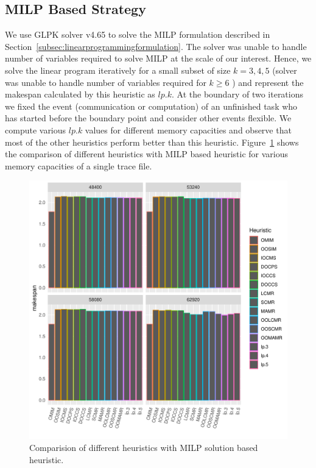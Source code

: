 \documentclass[sigconf]{acmart}
\begin{document}
	
	\subsection{MILP Based Strategy}
	We use GLPK solver v4.65 to solve the MILP formulation described in Section~\ref{subsec:linearprogrammingformulation}. The solver was unable to handle number of variables required to solve MILP at the scale of our interest. Hence, we solve the linear program iteratively for a small subset of size $k=3,4,5$ (solver was unable to handle number of variables required for $k\ge6$ ) and represent the makespan calculated by this heuristic as $lp.k$. At the boundary of two iterations we fixed the event (communication or computation) of an unfinished task who has  started before the boundary point and consider other events flexible. We compute various  $lp.k$ values for different memory capacities and observe that most of the other heuristics perform better than this heuristic. Figure~\ref{fig:iterativeLpSolution} shows the comparison of different heuristics with MILP based heuristic for various memory capacities of a single trace file.
	\begin{figure}[htb]
		\includegraphics[scale=0.5]{./results/makespan_with_lp.pdf}
		\caption{Comparision of different heuristics with MILP solution based heuristic.}
		\label{fig:iterativeLpSolution}
	\end{figure}
	
\end{document}
